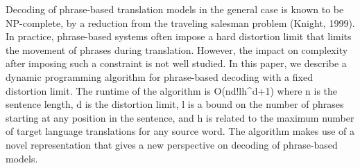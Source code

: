 Decoding of phrase-based translation models in the general case is known to be NP-complete, by a reduction from the traveling salesman problem (Knight, 1999). In practice, phrase-based systems often impose a hard distortion limit that limits the movement of phrases during translation. However, the impact on complexity after imposing such a constraint is not well studied. In this paper, we describe a dynamic programming algorithm for phrase-based decoding with a fixed distortion limit. The runtime of the algorithm is O(nd!lh^{d+1}) where n is the sentence length, d is the distortion limit, l is a bound on the number of phrases starting at any position in the sentence, and h is related to the maximum number of target language translations for any source word. The algorithm makes use of a novel representation that gives a new perspective on decoding of phrase-based models.